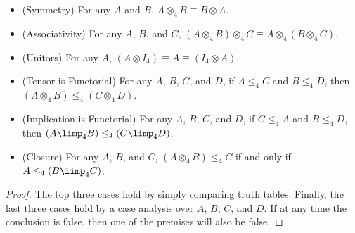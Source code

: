 \begin{lemma}
  \label{lemma:tensor_is_symmetric_monoidal_closed}
  \begin{itemize}
  \item[] (Symmetry) For any $A$ and $B$, $A \otimes_4 B \equiv B \otimes A$.\\[-5px]
  \item[] (Associativity) For any $A$, $B$, and $C$, $(A \otimes_4 B) \otimes_4 C \equiv A \otimes_4 (B \otimes_4 C)$.\\[-5px]
  \item[] (Unitors) For any $A$, $(A \otimes I_4) \equiv A \equiv (I_4 \otimes A)$.\\[-5px]
  \item[] (Tensor is Functorial) For any $A$, $B$, $C$, and $D$, if $A \leq_4 C$ and $B \le_4 D$, then
    $(A \otimes_4 B) \leq_4 (C \otimes_4 D)$.\\[-5px]
  \item[] (Implication is Functorial) For any $A$, $B$, $C$, and $D$, if
    $C \leq_4 A$ and $B \leq_4 D$, then $(A \limp_4 B) \leq_4 (C
    \limp_4 D)$.\\[-5px]
  \item[] (Closure) For any $A$, $B$, and $C$, $(A \otimes_4 B) \leq_4 C$ if and only if $A \leq_4 (B \limp_4 C)$.
  \end{itemize}
\end{lemma}
\begin{proof}
  The top three cases hold by simply comparing truth tables. Finally,
  the last three cases hold by a case analysis over $A$, $B$, $C$, and
  $D$.  If at any time the conclusion is false, then one of the
  premises will also be false.
\end{proof}

